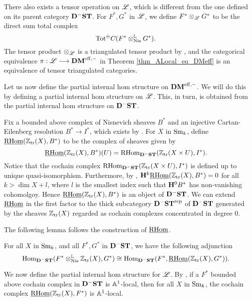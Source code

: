 There also exists a tensor operation on $\ALocal$, which is different
from the one defined on its parent category $\DShCor$.  For $F^*, G^*$
in $\ALocal$, we define $F^* \tAL G^*$ to be the direct sum total 
complex 
\[
\mathrm{Tot}^{\oplus} \suslC[]( F^* \tLNis G^* ).
\]
The tensor product $\tAL$ is a triangulated tensor product
by \cite[14.11]{MVW}, and the categorical equivalence $\pi: 
\ALocal \to \DMeff$ in Theorem \ref{thm_ALocal_eq_DMeff} is an 
equivalence of tensor triangulated categories.

Let us now define the partial internal hom structure on $\DMeff$.
We will do this by defining a partial internal hom structure on
$\ALocal$. This, in turn, is obtained from the partial internal 
hom structure on $\DShCor$.

\begin{defn}\label{def_pihom_DShCor}
Fix a bounded above complex of Nisnevich sheaves $B^*$ and an
injective Cartan-Eilenberg resolution $B^* \to I^*$, which
exists by \cite[6.19]{MVW}. For $X$ in $\Sm$, define 
$\sheaf{\rhom}(\Ztr(X), B^*)$ to be the complex of sheaves given 
by
\[
\sheaf{\rhom}(\Ztr(X), B^*)(U) = \rhom_{\DShCor}(\Ztr(X \times U),
I^*).
\]
Notice that the cochain complex $\rhom_{\DShCor}(\Ztr(X \times U), I^*)$
is defined up to unique quasi-isomorphism. Furthermore, by \cite[3.2.9]{TriCa}, $\HH^k \sheaf{\rhom}(\Ztr(X), B^*) = 0$ for
all $k > \dim X + l$, where $l$ is the smallest index such that
$\HH^0B^*$ has non-vanishing cohomolgoy. Hence $\sheaf{\rhom}(\Ztr(X),
B^*)$ is an object of $\DShCor$. We can extend $\sheaf{\rhom}$ in the
first factor to the thick subcategory $\DShCor^{\compact}$ of 
$\DShCor$ generated by the sheaves $\Ztr(X)$ regarded as
cochain complexes concentrated in degree 0.
\end{defn}

The following lemma follows the construction of $\sheaf{\rhom}$.

\begin{lem}\label{lem_ihom_tL_adjunction}
For all $X$ in $\Sm$, and all $F^*, G^*$ in $\DShCor$, we 
have the following adjunction
\[
\hom_{\DShCor}(F^*\tLNis \Ztr(X), G^*) \cong
\hom_{\DShCor}(F^*, \sheaf{\rhom}(\Ztr(X), G^*)).
\]
\end{lem}

We now define the partial internal hom structure for $\ALocal$.
By \cite[14.12]{MVW}, if a $F^*$ bounded above cochain complex
in $\DShCor$ is $\A^1$-local, then for all $X$ in $\Sm$,
the cochain complex $\sheaf{\rhom}(\Ztr(X), F^*)$ is $\A^1$-local. 

